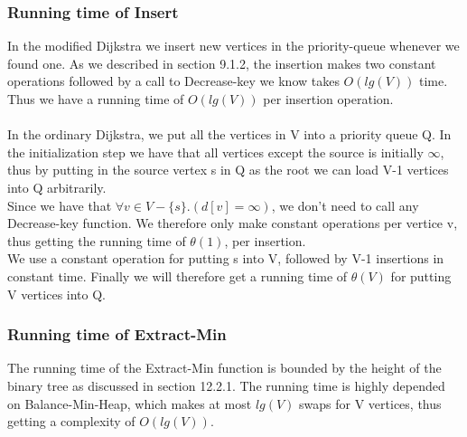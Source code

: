 \documentclass[11pt]{article}
\begin{document}
\subsubsection{Running time of Insert}
In the modified Dijkstra we insert new vertices in the priority-queue whenever we found one. As we described in section 9.1.2, the insertion makes two constant operations followed by a call to Decrease-key we know takes $O(lg(V))$ time. Thus we have a running time of $O(lg(V))$ per insertion operation.\\\\
In the ordinary Dijkstra, we put all the vertices in V into a priority queue Q. In the initialization step we have that all vertices except the source is initially $\infty$, thus by putting in the source vertex s in Q as the root we can load V-1 vertices into Q arbitrarily.\\ Since we have that $\forall v \in V-\{s\}. (d[v] = \infty)$, we don't need to call any Decrease-key function. We therefore only make constant operations per vertice v, thus getting the running time of $\theta(1)$, per insertion.\\We use a constant operation for putting s into V, followed by V-1 insertions in constant time. Finally we will therefore get a running time of $\theta(V)$ for putting V vertices into Q.
\subsubsection{Running time of Extract-Min}
The running time of the Extract-Min function is bounded by the height of the binary tree as discussed in section 12.2.1. The running time is highly depended on Balance-Min-Heap, which makes at most $lg(V)$ swaps for V vertices, thus getting a complexity of $O(lg(V))$.
\end{document}
